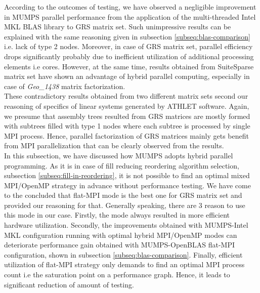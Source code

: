 According to the outcomes of testing, we have observed a negligible improvement in MUMPS parallel performance from the application of the multi-threaded Intel MKL BLAS library to GRS matrix set. Such unimpressive results can be explained with the same reasoning given in subsection \ref{subseq:blas-comparison} i.e. lack of type 2 nodes. Moreover, in case of GRS matrix set, parallel efficiency drops significantly probably due to inefficient utilization of additional processing elements i.e cores. However, at the same time, results obtained from SuiteSparse matrix set have shown an advantage of hybrid parallel computing, especially in case of \textit{Geo\_1438} matrix factorization.\\


These contradictory results obtained from two different matrix sets second our reasoning of specifics of linear systems generated by ATHLET software. Again, we presume that assembly trees resulted from GRS matrices are mostly formed with subtrees filled with type 1 nodes where each subtree is processed by single MPI process. Hence, parallel factorization of GRS matrices mainly gets benefit from MPI parallelization that can be clearly observed from the results.\\



In this subsection, we have discussed how MUMPS adopts hybrid parallel programming. As it is in case of fill reducing reordering algorithm selection, subsection \ref{subseq:fill-in-reordering}, it is not possible to find an optimal mixed MPI/OpenMP strategy in advance without performance testing. We have come to the concluded that flat-MPI mode is the best one for GRS matrix set and provided our reasoning for that. Generally speaking, there are 3 reason to use this mode in our case. Firstly, the mode always resulted in more efficient hardware utilization. Secondly, the improvements obtained with MUMPS-Intel MKL configuration running with optimal hybrid MPI/OpenMP modes can deteriorate performance gain obtained with MUMPS-OpenBLAS flat-MPI configuration, shown in subsection \ref{subseq:blas-comparison}. Finally, efficient utilization of flat-MPI strategy only demands to find an optimal MPI process count i.e the saturation point on a performance graph. Hence, it leads to significant reduction of amount of testing. \\
